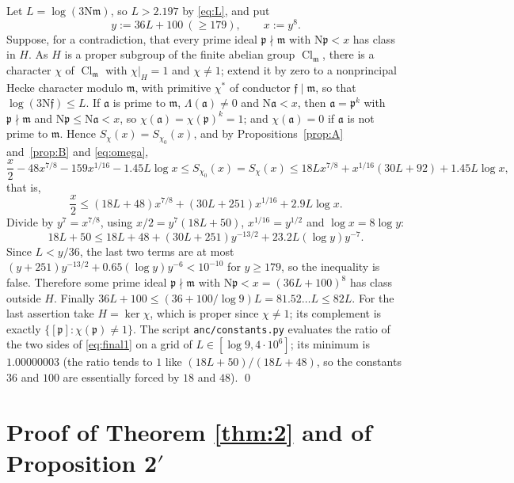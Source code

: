\documentclass[11pt]{article}
\theoremstyle{definition}
\theoremstyle{remark}
\numberwithin{equation}{section}
\newcommand{\fa}{\mathfrak a}
\newcommand{\fp}{\mathfrak p}
\newcommand{\fm}{\mathfrak m}
\newcommand{\ff}{\mathfrak f}
\newcommand{\Nm}{\mathrm N}
\newcommand{\Cl}{\operatorname{Cl}}
\begin{document}
Let $L=\log(3\Nm\fm)$, so $L>2.197$ by \eqref{eq:L}, and put
\[
 y:=36L+100\ (\ge179),\qquad x:=y^8 .
\]
Suppose, for a contradiction, that every prime ideal $\fp\nmid\fm$ with $\Nm\fp<x$ has class in $H$. As $H$ is a proper subgroup of the finite abelian group $\Cl_\fm$, there is a character $\chi$ of $\Cl_\fm$ with $\chi|_H=1$ and $\chi\ne1$; extend it by zero to a nonprincipal Hecke character modulo $\fm$, with primitive $\chi^*$ of conductor $\ff\mid\fm$, so that $\log(3\Nm\ff)\le L$. If $\fa$ is prime to $\fm$, $\Lambda(\fa)\ne0$ and $\Nm\fa<x$, then $\fa=\fp^k$ with $\fp\nmid\fm$ and $\Nm\fp\le\Nm\fa<x$, so $\chi(\fa)=\chi(\fp)^k=1$; and $\chi(\fa)=0$ if $\fa$ is not prime to $\fm$. Hence $S_\chi(x)=S_{\chi_0}(x)$, and by Propositions~\ref{prop:A} and~\ref{prop:B} and \eqref{eq:omega},
\[
 \frac x2-48x^{7/8}-159x^{1/16}-1.45L\log x\le S_{\chi_0}(x)=S_\chi(x)\le18Lx^{7/8}+x^{1/16}(30L+92)+1.45L\log x,
\]
that is,
\begin{equation}\label{eq:final1}
 \frac x2\le(18L+48)x^{7/8}+(30L+251)x^{1/16}+2.9L\log x .
\end{equation}
Divide by $y^7=x^{7/8}$, using $x/2=y^7(18L+50)$, $x^{1/16}=y^{1/2}$ and $\log x=8\log y$:
\[
 18L+50\le18L+48+(30L+251)y^{-13/2}+23.2L(\log y)y^{-7}.
\]
Since $L<y/36$, the last two terms are at most $(y+251)y^{-13/2}+0.65(\log y)y^{-6}<10^{-10}$ for $y\ge179$, so the inequality is false. Therefore some prime ideal $\fp\nmid\fm$ with $\Nm\fp<x=(36L+100)^8$ has class outside $H$. Finally $36L+100\le(36+100/\log9)L=81.52\ldots L\le82L$. For the last assertion take $H=\ker\chi$, which is proper since $\chi\ne1$; its complement is exactly $\{[\fp]:\chi(\fp)\ne1\}$. The script \texttt{anc/constants.py} evaluates the ratio of the two sides of \eqref{eq:final1} on a grid of $L\in[\log9,4\cdot10^6]$; its minimum is $1.00000003$ (the ratio tends to $1$ like $(18L+50)/(18L+48)$, so the constants $36$ and $100$ are essentially forced by $18$ and $48$). \qed

\section{Proof of Theorem \texorpdfstring{\ref{thm:2}}{2} and of Proposition \texorpdfstring{2$'$}{2'}}\label{sec:thm2}
\end{document}
